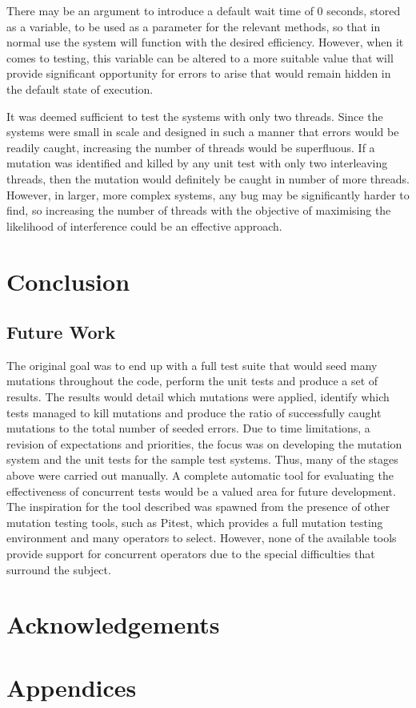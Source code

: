 \documentclass[a4paper,12pt]{article}
\begin{document}
There may be an argument to introduce a default wait time of 0 seconds, stored as a variable, to be used as a parameter for the relevant methods, so that in normal use the system will function with the desired efficiency. However, when it comes to testing, this variable can be altered to a more suitable value that will provide significant opportunity for errors to arise that would remain hidden in the default state of execution. 

It was deemed sufficient to test the systems with only two threads. Since the systems were small in scale and designed in such a manner that errors would be readily caught, increasing the number of threads would be superfluous. If a mutation was identified and killed by any unit test with only two interleaving threads, then the mutation would definitely be caught in number of more threads. However, in larger, more complex systems, any bug may be significantly harder to find, so increasing the number of threads with the objective of maximising the likelihood of interference could be an effective approach.

    
    
\newpage	
\section{Conclusion}

\subsection{Future Work}
The original goal was to end up with a full test suite that would seed many mutations throughout the code, perform the unit tests and produce a set of results. The results would detail which mutations were applied, identify which tests managed to kill mutations and produce the ratio of successfully caught mutations to the total number of seeded errors. Due to time limitations, a revision of expectations and priorities, the focus was on developing the mutation system and the unit tests for the sample test systems. Thus, many of the stages above were carried out manually. A complete automatic tool for evaluating the effectiveness of concurrent tests would be a valued area for future development. The inspiration for the tool described was spawned from the presence of other mutation testing tools, such as Pitest, which provides a full mutation testing environment and many operators to select. However, none of the available tools provide support for concurrent operators due to the special difficulties that surround the subject.
    
\newpage
\section{Acknowledgements}



\newpage
\appendix
\section{Appendices}
\end{document}
